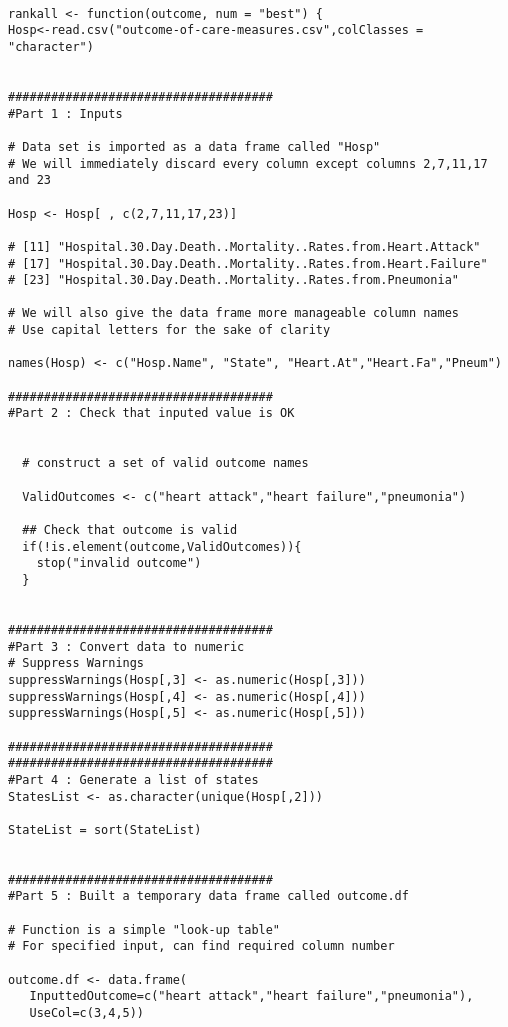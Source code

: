 \documentclass[]{article}
\begin{document}
\begin{framed}
\begin{verbatim}

rankall <- function(outcome, num = "best") {
Hosp<-read.csv("outcome-of-care-measures.csv",colClasses = "character")


#####################################
#Part 1 : Inputs

# Data set is imported as a data frame called "Hosp"
# We will immediately discard every column except columns 2,7,11,17 and 23

Hosp <- Hosp[ , c(2,7,11,17,23)]

# [11] "Hospital.30.Day.Death..Mortality..Rates.from.Heart.Attack"                            
# [17] "Hospital.30.Day.Death..Mortality..Rates.from.Heart.Failure"                           
# [23] "Hospital.30.Day.Death..Mortality..Rates.from.Pneumonia"        

# We will also give the data frame more manageable column names
# Use capital letters for the sake of clarity

names(Hosp) <- c("Hosp.Name", "State", "Heart.At","Heart.Fa","Pneum")

#####################################
#Part 2 : Check that inputed value is OK


  # construct a set of valid outcome names

  ValidOutcomes <- c("heart attack","heart failure","pneumonia")

  ## Check that outcome is valid
  if(!is.element(outcome,ValidOutcomes)){
    stop("invalid outcome")
  }


#####################################
#Part 3 : Convert data to numeric
# Suppress Warnings
suppressWarnings(Hosp[,3] <- as.numeric(Hosp[,3]))
suppressWarnings(Hosp[,4] <- as.numeric(Hosp[,4]))
suppressWarnings(Hosp[,5] <- as.numeric(Hosp[,5]))

#####################################
#####################################
#Part 4 : Generate a list of states
StatesList <- as.character(unique(Hosp[,2]))

StateList = sort(StateList)


#####################################
#Part 5 : Built a temporary data frame called outcome.df

# Function is a simple "look-up table"
# For specified input, can find required column number

outcome.df <- data.frame(
   InputtedOutcome=c("heart attack","heart failure","pneumonia"),
   UseCol=c(3,4,5))



\end{verbatim}
\end{framed}
\end{document}
